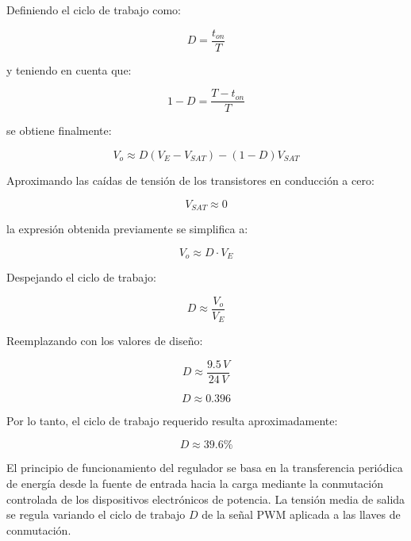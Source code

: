 \documentclass[]{article}
\begin{document}
	Definiendo el ciclo de trabajo como:
	
	\begin{equation}
		D = \frac{t_{on}}{T}
	\end{equation}
	
	y teniendo en cuenta que:
	
	\begin{equation}
		1-D = \frac{T-t_{on}}{T}
	\end{equation}
	
	se obtiene finalmente:
	
	\begin{equation}
		V_o \approx D(V_E - V_{SAT}) - (1-D)V_{SAT}
	\end{equation}
	
	
	Aproximando las caídas de tensión de los transistores en conducción a cero:
	
	\begin{equation}
		V_{SAT} \approx 0
	\end{equation}
	
	la expresión obtenida previamente se simplifica a:
	
	\begin{equation}
		V_o \approx D \cdot V_E
	\end{equation}
	
	Despejando el ciclo de trabajo:
	
	\begin{equation}
		D \approx \frac{V_o}{V_E}
	\end{equation}
	
	Reemplazando con los valores de diseño:
	
	\begin{equation}
		D \approx \frac{9.5\,V}{24\,V}
	\end{equation}
	
	\begin{equation}
		D \approx 0.396
	\end{equation}
	
	Por lo tanto, el ciclo de trabajo requerido resulta aproximadamente:
	
	\begin{equation}
		D \approx 39.6\%
	\end{equation}
	
	
	El principio de funcionamiento del regulador se basa en la transferencia periódica de energía desde la fuente de entrada hacia la carga mediante la conmutación controlada de los dispositivos electrónicos de potencia. La tensión media de salida se regula variando el ciclo de trabajo $D$ de la señal PWM aplicada a las llaves de conmutación.
	
\end{document}
